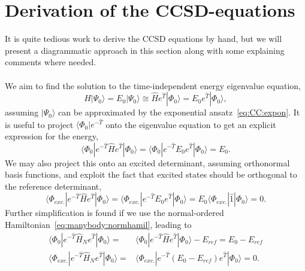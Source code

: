 \section{Derivation of the CCSD-equations}
It is quite tedious work to derive the CCSD equations by hand, but we will present a diagrammatic approach in this section along with some explaining comments where needed. 

\paragraph{}
We aim to find the solution to the time-independent energy eigenvalue equation,
\begin{equation}
\hat{H} |\Psi_0 \rangle = E_0 |\Psi_0 \rangle
\cong
\hat{H} e^{\hat{T}} |\Phi_0 \rangle = E_0 e^{\hat{T}} |\Phi_0 \rangle ,
\end{equation}
assuming $|\Psi_0\rangle$ can be approximated by the exponential ansatz~\eqref{eq:CC:expon}. 
It is useful to project $\langle \Phi_0 | e^{-\hat{T}}$ onto the eigenvalue equation to get an explicit expression for the energy,
\begin{equation}
\langle \Phi_0 | e^{-\hat{T}} \hat{H} e^{\hat{T}} |\Phi_0 \rangle 
=
\langle \Phi_0 | e^{-\hat{T}} E_0 e^{\hat{T}} |\Phi_0 \rangle
= E_0 .
\end{equation}
We may also project this onto an excited determinant, assuming orthonormal basis functions, and exploit the fact that excited states should be orthogonal to the reference determinant,
\begin{equation}
\langle \Phi_{exc.} | e^{-\hat{T}} \hat{H} e^{\hat{T}} |\Phi_0 \rangle 
=
\langle \Phi_{exc.} | e^{-\hat{T}} E_0 e^{\hat{T}} |\Phi_0 \rangle
=
E_0 \langle \Phi_{exc.} | \hat{1} |\Phi_0 \rangle
= 0 .
\end{equation}
Further simplification is found if we use the normal-ordered Hamiltonian~\eqref{eq:manybody:normhamil}, leading to
\begin{equation}
\begin{split}
\langle \Phi_0 | e^{-\hat{T}} \hat{H}_N e^{\hat{T}} |\Phi_0 \rangle 
=&
\langle \Phi_0 | e^{-\hat{T}} \hat{H} e^{\hat{T}} |\Phi_0 \rangle - E_{ref}
=
E_0 - E_{ref} \\
\langle \Phi_{exc.} | e^{-\hat{T}} \hat{H}_N e^{\hat{T}} |\Phi_0 \rangle 
=&
\langle \Phi_{exc.} | e^{-\hat{T}} (E_0 - E_{ref}) e^{\hat{T}} |\Phi_0 \rangle
=
0 .
\end{split}
\end{equation}


